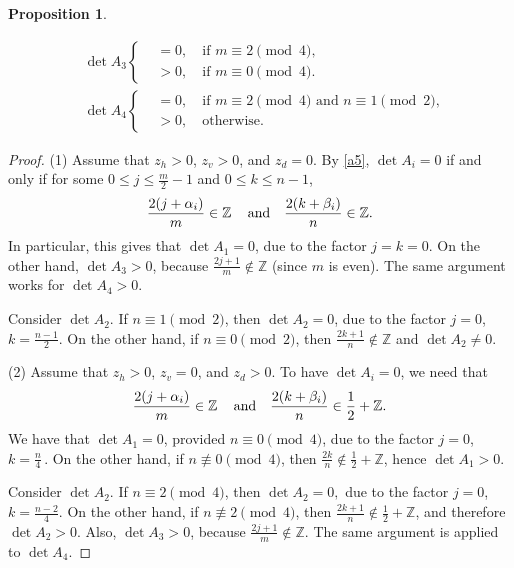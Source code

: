 \documentclass[12pt,reqno]{amsart}
\numberwithin{equation}{section}
\newcommand{\Z}{{\mathbb Z}}
\newtheorem{prop}[theo]{{\sc \bf Proposition}}
\begin{document}
\begin{prop}
\begin{enumerate}
\begin{equation}
\begin{aligned}
&\det A_3
\left\{
\begin{aligned}
&=0,\quad \textrm{if $m\equiv 2 \pmod 4$},\\
&>0,\quad \textrm{if $m\equiv 0 \pmod 4$}.
\end{aligned}
\right.\\
&\det A_4
\left\{
\begin{aligned}
&=0,\quad \textrm{if $m\equiv 2 \pmod 4$ and $n\equiv 1 \pmod 2$},\\
&>0,\quad \textrm{otherwise}.
\end{aligned}
\right.
\end{aligned}
\end{equation}
\end{enumerate}
\end{prop}

\begin{proof} (1) Assume that $z_h>0$, $z_v>0$, and $z_d=0$. By \eqref{a5}, $\det A_i=0$ if and only if for some 
$0\le j\le \frac{m}{2}-1$ and $0\le k\le n-1$,
\begin{equation}\label{aa1}
\begin{aligned}
\frac{2(j+\alpha_i)}{m}\in\Z\,\quad {\rm and} \quad \frac{2(k+\beta_i)}{n}\in\Z.
\end{aligned}
\end{equation}
In particular, this gives that 
$\det A_1=0$, due to the factor $j=k=0$.
On the other hand, $\det A_3>0$, because $\frac{2j+1}{m} \not\in\Z$
(since $m$ is even).
The same argument works for $\det A_4>0$.

Consider $\det A_2$.
If $n\equiv 1\pmod 2$, then $\det A_2=0$, due to the factor $j=0$, $k=\frac{n-1}{2}$. On the other hand,
if $n\equiv 0\pmod 2$, then 
$
\frac{2k+1}{n}\not\in\Z
$
and $\det A_2\not=0$.

(2) Assume that $z_h>0$, $z_v=0$, and $z_d>0$. To have $\det A_i=0$, we need that
\begin{equation}\label{aa2}
\begin{aligned}
\frac{2(j+\alpha_i)}{m}\in\Z\,\quad {\rm and} \quad \frac{2(k+\beta_i)}{n}
\in \frac{1}{2}+\Z.
\end{aligned}
\end{equation}
We have that $\det A_1=0$, provided $n\equiv 0 \pmod 4$,
due to the factor $j=0$, $k=\frac{n}{4}\,$. On the other hand, if $n\not \equiv 0 \pmod 4$, then 
$\frac{2 k}{n}\not \in\frac{1}{2}+\Z$, hence $\det A_1>0$.

Consider $\det A_2$.
If $n\equiv 2 \pmod 4$, then $\det A_2=0,$ due to the factor $j=0$, $k=\frac{n-2}{4}.$ 
On the other hand, if $n\not\equiv 2 \pmod 4$, then $\frac{2k+1}{n}\not\in\frac{1}{2}+\Z$, 
and therefore $\det A_2>0$. Also, $\det A_3>0$, because $\frac{2j+1}{m}\not \in\Z$.
The same argument is applied to $\det A_4$.


\end{proof}
\end{document}
